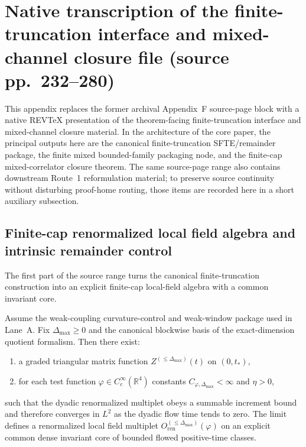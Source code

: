 \section{Native transcription of the finite-truncation interface and mixed-channel closure file (source pp.~232--280)}
This appendix replaces the former archival Appendix~F source-page block with a native REV\TeX{} presentation of the theorem-facing finite-truncation interface and mixed-channel closure material. In the architecture of the core paper, the principal outputs here are the canonical finite-truncation SFTE/remainder package, the finite mixed bounded-family packaging node, and the finite-cap mixed-correlator closure theorem. The same source-page range also contains downstream Route~1 reformulation material; to preserve source continuity without disturbing proof-home routing, those items are recorded here in a short auxiliary subsection.

\subsection{Finite-cap renormalized local field algebra and intrinsic remainder control}
The first part of the source range turns the canonical finite-truncation construction into an explicit finite-cap local-field algebra with a common invariant core.

\begin{theorem}
Assume the weak-coupling curvature-control and weak-window package used in Lane~A. Fix $\Delta_{\max}\ge 0$ and the canonical blockwise basis of the exact-dimension quotient formalism. Then there exist:
\begin{enumerate}[label=(\roman*),leftmargin=2.2em]
\item a graded triangular matrix function $Z^{(\le \Delta_{\max})}(t)$ on $(0,t_\ast)$,
\item for each test function $\varphi\in C_c^\infty(\mathbb R^4)$ constants $C_{\varphi,\Delta_{\max}}<\infty$ and $\eta>0$,
\end{enumerate}
such that the dyadic renormalized multiplet obeys a summable increment bound and therefore converges in $L^2$ as the dyadic flow time tends to zero. The limit defines a renormalized local field multiplet $O_{\mathrm{ren}}^{(\le \Delta_{\max})}(\varphi)$ on an explicit common dense invariant core of bounded flowed positive-time classes.
\end{theorem}

